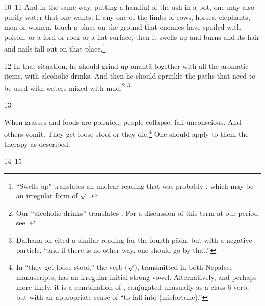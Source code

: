 \begin{translation}
\item
 [10--11]  And in the same way, putting a handful of  the ash in a pot, one may 
 also purify water  that  one wants.  If any one of the limbs of cows, horses,  
 elephants, men or women, touch a place on the ground that enemies have 
 spoiled with  poison, or a ford or rock or a flat surface, then it swells up and 
 burns and its  hair and nails fall out on that place.\footnote{``Swells up" 
 translates an  unclear reading that was probably , which may be 
 an irregular  form of $\surd$  
 \citep[see][175--176]{whit-root}.}  

\item
 [12]  In that situation, he should grind up  \gls{anantā} together with all the  
 aromatic items, with alcoholic drinks.  And then he should sprinkle the paths 
 that need to be used with waters mixed with  mud.\footnote{Our “alcoholic 
 drinks”  translates .  For a discussion of this  term at our period see 
 \cite[37--39 \emph{et passim}]{mchu-2021}.}  \footnote{Ḍalhaṇa on   
 cited a similar  reading for the fourth pāda, but with a negative particle, “and if 
 there is no other way, one  should go by that.”}  

\item [13]  

When grasses and foods are  polluted, people collapse, fall
unconscious. And others vomit. They get  loose 
stool or they  die.\footnote{In “they get loose stool,” the verb
     ($\surd$), transmitted in both Nepalese
    manuscripts, has an irregular initial strong vowel. Alternatively, and
    perhaps more likely, it is a combination of ,
    conjugated unusually as a class 6 verb, but with an appropriate sense
    of “to fall into (misfortune).”}  One should apply to them the therapy
    as described.

\item [14--15]  


\end{translation}
